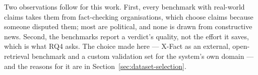 Two observations follow for this work. First, every benchmark with
real-world claims takes them from fact-checking organisations, which
choose claims because someone disputed them; most are political, and
none is drawn from constructive news. Second, the benchmarks report a
verdict's quality, not the effort it saves, which is what RQ4 asks.
The choice made here --- X-Fact as an external, open-retrieval
benchmark and a custom validation set for the system's own domain ---
and the reasons for it are in Section~\ref{sec:dataset-selection}.
